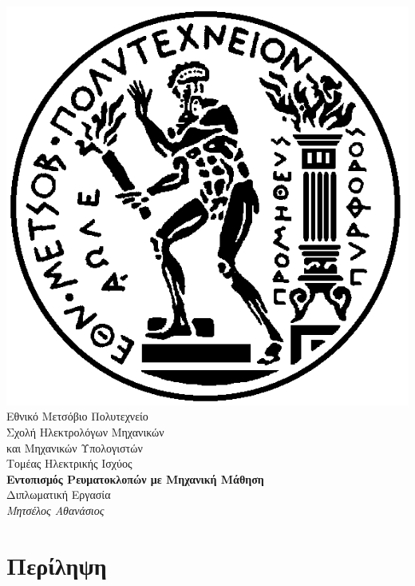 \documentclass[11pt, twoside]{report}
\begin{document}
\begin{titlepage}
	\begin{center}
		\includegraphics[scale=0.2]{pyrforos.png}\\
		\Large{Εθνικό Μετσόβιο Πολυτεχνείο}\\
		\large{Σχολή Ηλεκτρολόγων Μηχανικών\\ και Μηχανικών Υπολογιστών}\\
		\large{Τομέας Ηλεκτρικής Ισχύος}\\	
      	\Large\textbf{Εντοπισμός Ρευματοκλοπών με Μηχανική Μάθηση}\\      	
      	\large{Διπλωματική Εργασία}\\
      	\large\textit{Μητσέλος Αθανάσιος}
   	\end{center}
\end{titlepage}

\chapter*{Περίληψη}
\end{document}
